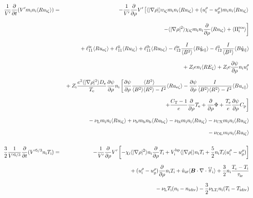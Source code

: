 \documentclass[11pt]{article}
\def\bvec#1{\leavevmode\hbox{\boldmath$#1$}}
\let\vec=\bvec
\def\r#1{{\rm#1}}
\def\aves#1{\langle#1\rangle}
\def\dd#1#2{\frac{\partial #1}{\partial #2}}
\def\tensor#1{\mathord{\displaystyle\mathop{#1}^\leftrightarrow}}
\def\para{\parallel}
\def\ddrho{\frac{\partial}{\partial\rho}}
\def\mi{m_\r{i}}
\def\mb{m_\r{b}}
\def\ni{n_\r{i}}
\def\nb{n_\r{b}}
\def\Te{T_\r{e}}
\def\Ti{T_\r{i}}
\def\Zi{Z_\r{i}}
\def\uezt{u_{\r{e}\zeta}}
\def\uizt{u_{\r{i}\zeta}}
\def\ubzt{u_{\r{b}\zeta}}
\def\uepara{u_{\r{e}\para}}
\def\ubpara{u_{\r{b}\para}}
\def\qhatepara{\hat{q}_{\r{e}\para}}
\def\qhatipara{\hat{q}_{\r{i}\para}}
\def\uirho{u_\r{i}^\rho}
\def\ugrho{u_{g}^\rho}
\def\chii{\chi_\r{i}}
\def\bri{\aves{B^2}\aves{R^2} - I^2}
\def\ddt{\frac{\partial}{\partial t}}
\def\De{D_\r{e}}
\def\nuni{\nu_\r{0i}}
\def\nuL{\nu_\r{L}}
\def\nuCX{\nu_\r{CX}}
\def\nub{\nu_\r{b}}
\def\nidiv{n_\r{idiv}}
\def\Tidiv{T_\r{idiv}}
\def\nuLTi{\nu_{\r{L}T_\r{i}}}
\def\nuOL{\nu_\r{OL}}
\begin{document}
\begin{eqnarray}
\\[5mm]
 \frac{1}{V'} \ddt (V' \mi \ni \aves{R \uizt}) &=&
%
  - \frac{1}{V'} \ddrho V' \left[  \aves{|\nabla\rho|} v_{\r{i}\zeta} \mi \ni \aves{R \uizt}
			       +   (\uirho - \ugrho) \mi \ni \aves{R \uizt} \right.
\nonumber\\[3mm]&&{}
                        \left. - \aves{|\nabla\rho|^2} \chi_{\r{i}\zeta} \mi \ni
			         \ddrho \aves{R \uizt}
                               + \aves{\Pi_\r{i}^\r{res}} \right]
\nonumber\\[3mm]&&{}
%
  + \ell_{11}^\r{ie} \aves{R \uezt}
  + \ell_{11}^\r{ii} \aves{R \uizt}
  + \ell_{11}^\r{ib} \aves{R \ubzt}
%
  - \ell_{12}^\r{ie} \frac{I}{\aves{B^2}} \aves{B \qhatepara}
  - \ell_{12}^\r{ii} \frac{I}{\aves{B^2}} \aves{B \qhatipara}
\nonumber\\[2.5mm]&&{}
%
  + \Zi e                 \ni \aves{R E_\zeta}
%
  + \Zi e \dd{\psi}{\rho} \ni \uirho
%
\nonumber\\[2.5mm]&&{}
%
%
  + \Zi \frac{e^2 \aves{|\nabla\rho|^2} \De}{\Te} \dd{\psi}{\rho} \ni
    \left[  \dd{\psi}{\rho} \frac{\aves{B^2}}{\bri} \aves{R \uezt}
          - \dd{\psi}{\rho} \frac{I}{\bri} \aves{B \uepara} \right.
\nonumber\\[2.5mm]&&{}
    \left.+ \frac{C_\r{T}-1}{e} \ddrho \Te
	  + \ddrho \Phi
	  + \frac{\Te}{e} \dd{\psi}{\rho} C_\r{p} \right]
\nonumber\\[2.5mm]&&{}
%
  - \nuL  \mi \ni \aves{R \uizt}
%
  + \nub  \mb \nb \aves{R \ubzt}
%
  - \nuni \mi \ni \aves{R \uizt}
%
  - \nuCX \mi \ni \aves{R \uizt}
\nonumber\\[2.5mm]&&{}
%
  - \nuOL \mi \ni \aves{R \uizt}
\\[5mm]
 \frac{3}{2}\frac{1}{V'^{5/3}} \ddt (V'^{5/3} \ni \Ti ) &=& 
%
  - \frac{1}{V'} \ddrho V'
    \left[ - \chii          \aves{|\nabla\rho|^2} \ni \ddrho \Ti
           + V_\r{i}^\r{hp} \aves{|\nabla\rho|}   \ni \Ti
           + \frac{5}{2} \ni \Ti ( \uirho - \ugrho ) \right]
\nonumber\\[2.5mm]&&{}
%
  + ( \uirho - \ugrho ) \ddrho \ni \Ti
%
  + \hat{u}_{\r{i}\theta} \aves{\vec{B}\cdot\nabla\cdot\tensor{\pi}_\r{i}}
%
  + \frac{3}{2} \ni \frac{ \Te - \Ti }{\tau_\r{ie}}
\nonumber\\[2.5mm]&&{}
%
  - \nuL \Ti (\ni - \nidiv)
%
  - \frac{3}{2} \nuLTi \ni (\Ti - \Tidiv)
%
\nonumber\\[2.5mm]&&{}

\end{eqnarray}
\end{document}
